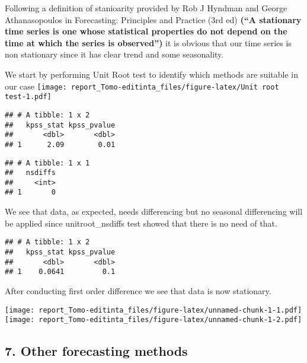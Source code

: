 \documentclass[
]{article}
\begin{document}
Following a definition of stanioarity provided by Rob J Hyndman and
George Athanasopoulos in Forecasting: Principles and Practice (3rd ed)
\textbf{(``A stationary time series is one whose statistical properties
do not depend on the time at which the series is observed'')} it is
obvious that our time series is non stationary since it has clear trend
and some seasonality.

We start by performing Unit Root test to identify which methods are
suitable in our case
\texttt{[image: report\_Tomo-editinta\_files/figure-latex/Unit root test-1.pdf]}

\begin{verbatim}
## # A tibble: 1 x 2
##   kpss_stat kpss_pvalue
##       <dbl>       <dbl>
## 1      2.09        0.01
\end{verbatim}

\begin{verbatim}
## # A tibble: 1 x 1
##   nsdiffs
##     <int>
## 1       0
\end{verbatim}

We see that data, as expected, needs differencing but no seasonal
differencing will be applied since unitroot\_nsdiffs test showed that
there is no need of that.

\begin{verbatim}
## # A tibble: 1 x 2
##   kpss_stat kpss_pvalue
##       <dbl>       <dbl>
## 1    0.0641         0.1
\end{verbatim}

After conducting first order difference we see that data is now
stationary.

\texttt{[image: report\_Tomo-editinta\_files/figure-latex/unnamed-chunk-1-1.pdf]}
\texttt{[image: report\_Tomo-editinta\_files/figure-latex/unnamed-chunk-1-2.pdf]}

\hypertarget{other-forecasting-methods}{%
\subsection{7. Other forecasting
methods}\label{other-forecasting-methods}}
\end{document}
